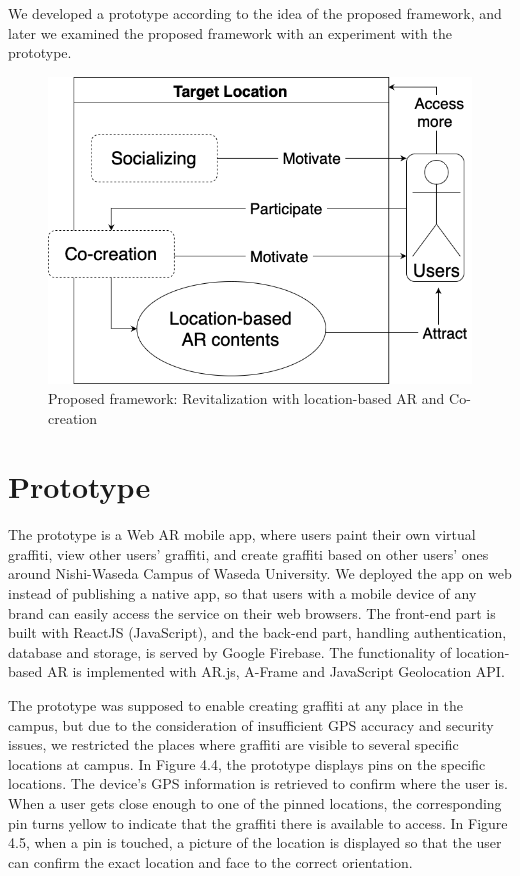 We developed a prototype according to the idea of the proposed framework, and later we examined the proposed framework with an experiment with the prototype.

\begin{figure}
  \centering
  \includegraphics[width=0.85\columnwidth]{resources/4_methodology/proposed_framework_revitalization_with_AR_and_cocreation.png}
    \caption{Proposed framework: Revitalization with location-based AR and Co-creation}
\end{figure}

\section{Prototype}
The prototype is a Web AR mobile app, where users paint their own virtual graffiti, view other users' graffiti, and create graffiti based on other users' ones around Nishi-Waseda Campus of Waseda University.
We deployed the app on web instead of publishing a native app, so that users with a mobile device of any brand can easily access the service on their web browsers.
The front-end part is built with ReactJS (JavaScript), and the back-end part, handling authentication, database and storage, is served by Google Firebase.
The functionality of location-based AR is implemented with AR.js, A-Frame and JavaScript Geolocation API.

The prototype was supposed to enable creating graffiti at any place in the campus, but due to the consideration of insufficient GPS accuracy and security issues,
we restricted the places where graffiti are visible to several specific locations at campus.
In Figure 4.4, the prototype displays pins on the specific locations. The device's GPS information is retrieved to confirm where the user is.
When a user gets close enough to one of the pinned locations, the corresponding pin turns yellow to indicate that the graffiti there is available to access.
In Figure 4.5, when a pin is touched, a picture of the location is displayed so that the user can confirm the exact location and face to the correct orientation.

